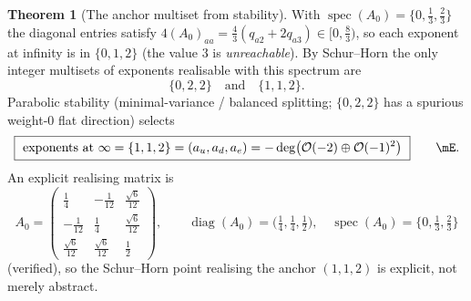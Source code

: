 \documentclass[11pt,a4paper]{article}
\theoremstyle{definition}
\newtheorem{theorem}{Theorem}
\begin{document}
\begin{theorem}[The anchor multiset from stability]
With $\operatorname{spec}(A_0)=\{0,\tfrac13,\tfrac23\}$ the diagonal entries satisfy
$4(A_0)_{aa}=\tfrac43(q_{a2}+2q_{a3})\in[0,\tfrac83)$, so each exponent at infinity is in $\{0,1,2\}$
(the value $3$ is \emph{unreachable}). By Schur--Horn the only integer multisets of exponents
realisable with this spectrum are
\[
  \{0,2,2\}\quad\text{and}\quad\{1,1,2\}.
\]
Parabolic stability (minimal-variance / balanced splitting; $\{0,2,2\}$ has a spurious weight-$0$ flat
direction) selects
\begin{equation}
  \boxed{\ \text{exponents at }\infty=\{1,1,2\}=(a_u,a_d,a_e)=-\deg\bigl(\mathcal O(-2)\oplus\mathcal O(-1)^2\bigr)\ }\qquad\mE .
\end{equation}
An explicit realising matrix is
\[
  A_0=\begin{pmatrix} \tfrac14 & -\tfrac1{12} & \tfrac{\sqrt6}{12}\\[2pt]
  -\tfrac1{12} & \tfrac14 & \tfrac{\sqrt6}{12}\\[2pt]
  \tfrac{\sqrt6}{12} & \tfrac{\sqrt6}{12} & \tfrac12 \end{pmatrix},\qquad
  \operatorname{diag}(A_0)=\bigl(\tfrac14,\tfrac14,\tfrac12\bigr),\quad \operatorname{spec}(A_0)=\{0,\tfrac13,\tfrac23\}
\]
(verified), so the Schur--Horn point realising the anchor $(1,1,2)$ is explicit, not merely abstract.
\end{theorem}
\end{document}

